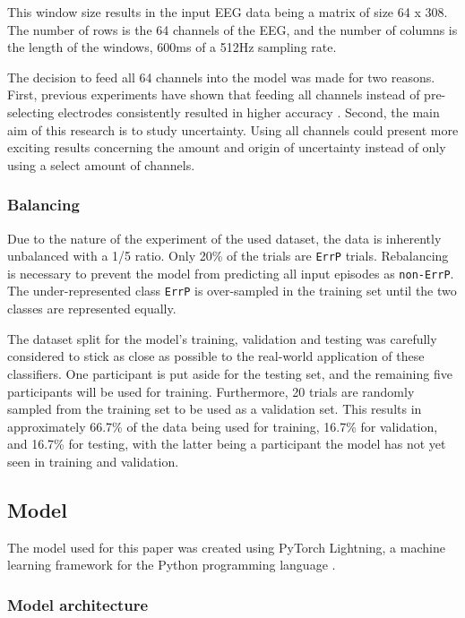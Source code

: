 This window size results in the input EEG data being a matrix of size 64 x 308. The number of rows is the 64 channels of the EEG, and the number of columns is the length of the windows, 600ms of a 512Hz sampling rate.

The decision to feed all 64 channels into the model was made for two reasons. First, previous experiments have shown that feeding all channels instead of pre-selecting electrodes consistently resulted in higher accuracy \citep{correia2021error}. Second, the main aim of this research is to study uncertainty. Using all channels could present more exciting results concerning the amount and origin of uncertainty instead of only using a select amount of channels.

\subsubsection{Balancing}

Due to the nature of the experiment of the used dataset, the data is inherently unbalanced with a 1/5 ratio. Only 20\% of the trials are \verb|ErrP| trials. Rebalancing is necessary to prevent the model from predicting all input episodes as \verb|non-ErrP|. The under-represented class \verb|ErrP| is over-sampled in the training set until the two classes are represented equally.

The dataset split for the model's training, validation and testing was carefully considered to stick as close as possible to the real-world application of these classifiers. One participant is put aside for the testing set, and the remaining five participants will be used for training. Furthermore, 20 trials are randomly sampled from the training set to be used as a validation set. This results in approximately 66.7\% of the data being used for training, 16.7\% for validation, and 16.7\% for testing, with the latter being a participant the model has not yet seen in training and validation. 


\subsection{Model}

The model used for this paper was created using PyTorch Lightning, a machine learning framework for the Python programming language \citep{falcon2019pytorch}.

\subsubsection{Model architecture}

